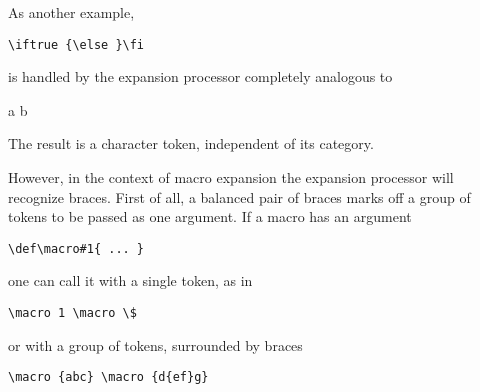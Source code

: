 \documentclass[letterpaper]{book}
\begin{document}
As another example, \begin{verbatim}
\iftrue {\else }\fi
\end{verbatim}
is handled by the expansion processor 
completely analogous to
\begin{disp} {\italic a} {\italic b}\end{disp}
The result is a character token, independent of its category.

However, in the context of macro expansion 
the expansion  processor will 
recognize braces. 
First of all, a balanced pair of braces marks off a group of tokens
to be passed as one argument.
If a macro has an argument \begin{verbatim}
\def\macro#1{ ... }
\end{verbatim}
one can call it with a single token, as in
\begin{verbatim}
\macro 1 \macro \$
\end{verbatim}
or with a group of tokens, surrounded by braces
\begin{verbatim}
\macro {abc} \macro {d{ef}g}
\end{verbatim}
\end{document}
